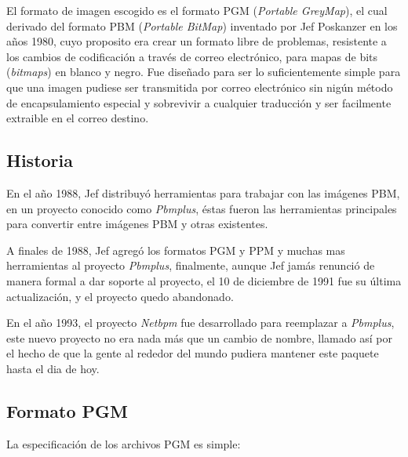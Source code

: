 El formato de imagen escogido es el formato PGM (\emph{Portable GreyMap}), el cual derivado del formato PBM (\emph{Portable BitMap}) inventado por Jef Poskanzer en los años 1980, cuyo proposito era crear un formato libre de problemas, resistente a los cambios de codificación a través de correo electrónico, para mapas de bits (\emph{bitmaps}) en blanco y negro. Fue diseñado para ser lo suficientemente simple para que una imagen pudiese ser transmitida por correo electrónico sin nigún método de encapsulamiento especial y sobrevivir a cualquier traducción y ser facilmente extraible en el correo destino.

\subsection{Historia}
\label{ch:implementacion:sec:formatounicoescogido:subsec:historia}

En el año 1988, Jef distribuyó herramientas para trabajar con las imágenes PBM, en un proyecto conocido como \emph{Pbmplus}, éstas fueron las herramientas principales para convertir entre imágenes PBM y otras existentes.

A finales de 1988, Jef agregó los formatos PGM y PPM y muchas mas herramientas al proyecto \emph{Pbmplus}, finalmente, aunque Jef jamás renunció de manera formal a dar soporte al proyecto, el 10 de diciembre de 1991 fue su última actualización, y el proyecto quedo abandonado.

En el año 1993, el proyecto \emph{Netbpm} fue desarrollado para reemplazar a \emph{Pbmplus}, este nuevo proyecto no era nada más que un cambio de nombre, llamado así por el hecho de que la gente al rededor del mundo pudiera mantener este paquete hasta el dia de hoy.

\subsection{Formato PGM}
\label{ch:implementacion:sec:formatounicoescogido:subsec:formatopgm}

La especificación de los archivos PGM es simple:

